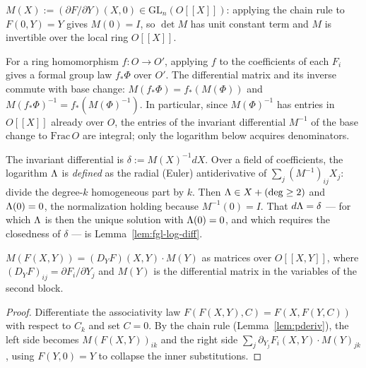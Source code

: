 \begin{definition}
\label{def:fgl-diff}
\leanok
{}
$M(X) := (\partial F/\partial Y)(X,0) \in \mathrm{GL}_n(O[[X]])$: applying the chain
rule to $F(0,Y) = Y$ gives $M(0) = I$, so $\det M$ has unit constant term and $M$ is
invertible over the local ring $O[[X]]$.
\end{definition}

\begin{definition}
\label{def:fgl-basechange}
\leanok
{}
For a ring homomorphism $f \colon O \to O'$, applying $f$ to the coefficients of each
$F_i$ gives a formal group law $f_*\Phi$ over $O'$. The differential matrix and its
inverse commute with base change: $M(f_*\Phi) = f_*(M(\Phi))$ and
$M(f_*\Phi)^{-1} = f_*(M(\Phi)^{-1})$. In particular, since $M(\Phi)^{-1}$ has entries
in $O[[X]]$ already over $O$, the entries of the invariant differential $M^{-1}$ of the
base change to $\mathrm{Frac}\,O$ are integral; only the logarithm below acquires
denominators.
\end{definition}

\begin{definition}
\label{def:fgl-log}
\leanok
{}
The invariant differential is $\delta := M(X)^{-1}dX$. Over a field of coefficients, the
logarithm $\Lambda$ is \emph{defined} as the radial (Euler) antiderivative of
$\sum_j (M^{-1})_{ij} X_j$: divide the degree-$k$ homogeneous part by $k$. Then
$\Lambda \in X + (\deg \ge 2)$ and $\Lambda(0) = 0$, the normalization holding because
$M^{-1}(0) = I$. That $d\Lambda = \delta$ --- for which $\Lambda$ is then the unique solution
with $\Lambda(0) = 0$, and which requires the closedness of $\delta$ --- is
Lemma~\ref{lem:fgl-log-diff}.
\end{definition}

\begin{lemma}
\label{lem:fgl-invariance-matrix}
\leanok
{}
$M(F(X,Y)) = (D_Y F)(X,Y)\cdot M(Y)$ as matrices over $O[[X,Y]]$, where
$(D_Y F)_{ij} = \partial F_i/\partial Y_j$ and $M(Y)$ is the differential matrix in the
variables of the second block.
\end{lemma}
\begin{proof}
\leanok
Differentiate the associativity law $F(F(X,Y),C) = F(X,F(Y,C))$ with respect to $C_k$
and set $C = 0$. By the chain rule (Lemma~\ref{lem:pderiv}), the left side becomes
$M(F(X,Y))_{ik}$ and the right side $\sum_j \partial_{Y_j}F_i(X,Y)\cdot M(Y)_{jk}$,
using $F(Y,0) = Y$ to collapse the inner substitutions.
\end{proof}

